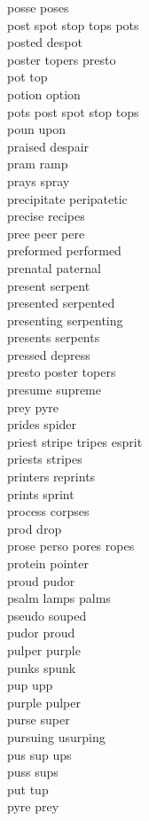 posse poses\\
post spot stop tops pots\\
posted despot\\
poster topers presto\\
pot top\\
potion option\\
pots post spot stop tops\\
poun upon\\
praised despair\\
pram ramp\\
prays spray\\
precipitate peripatetic\\
precise recipes\\
pree peer pere\\
preformed performed\\
prenatal paternal\\
present serpent\\
presented serpented\\
presenting serpenting\\
presents serpents\\
pressed depress\\
presto poster topers\\
presume supreme\\
prey pyre\\
prides spider\\
priest stripe tripes esprit\\
priests stripes\\
printers reprints\\
prints sprint\\
process corpses\\
prod drop\\
prose perso pores ropes\\
protein pointer\\
proud pudor\\
psalm lamps palms\\
pseudo souped\\
pudor proud\\
pulper purple\\
punks spunk\\
pup upp\\
purple pulper\\
purse super\\
pursuing usurping\\
pus sup ups\\
puss sups\\
put tup\\
pyre prey\\

